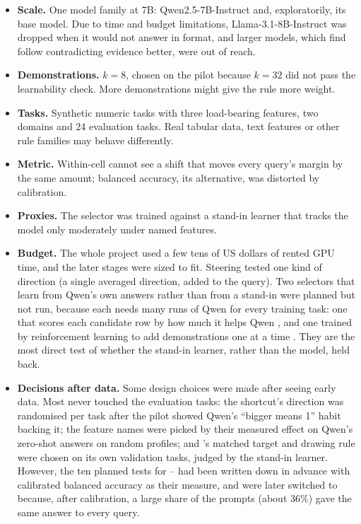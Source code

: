 \begin{itemize}[leftmargin=1.5em]
  \item \textbf{Scale.} One model family at 7B: Qwen2.5-7B-Instruct and, exploratorily, its base model. Due to time and budget limitations, Llama-3.1-8B-Instruct was dropped when it would not answer in format, and larger models, which \citet{wei2023larger} find follow contradicting evidence better, were out of reach.
  \item \textbf{Demonstrations.} $k = 8$, chosen on the pilot because $k = 32$ did not pass the learnability check. More demonstrations might give the rule more weight.
  \item \textbf{Tasks.} Synthetic numeric tasks with three load-bearing features, two domains and 24 evaluation tasks. Real tabular data, text features or other rule families may behave differently.
\item \textbf{Metric.} Within-cell \AUROC cannot see a shift that moves every query's margin by the same amount; balanced accuracy, its alternative, was distorted by calibration.
  \item \textbf{Proxies.} The selector was trained against a stand-in learner that tracks the model only moderately under named features.
\item \textbf{Budget.} The whole project used a few tens of US dollars of rented GPU time, and the later stages were sized to fit. Steering tested one kind of direction (a single averaged direction, added to the query). Two selectors that learn from Qwen's own answers rather than from a stand-in were planned but not run, because each needs many runs of Qwen for every training task: one that scores each candidate row by how much it helps Qwen \citep{chang2023data}, and one trained by reinforcement learning to add demonstrations one at a time \citep{zhang2022active}. They are the most direct test of whether the stand-in learner, rather than the model, held \sata back.

\item \textbf{Decisions after data.} Some design choices were made after seeing early data. Most never touched the evaluation tasks: the shortcut's direction was randomised per task after the pilot showed Qwen's ``bigger means 1'' habit backing it; the feature names were picked by their measured effect on Qwen's zero-shot answers on random profiles; and \sata's matched target and drawing rule were chosen on its own validation tasks, judged by the stand-in learner. However, the ten planned tests for -- had been written down in advance with calibrated balanced accuracy as their measure, and were later switched to \AUROC because, after calibration, a large share of the prompts (about 36\%) gave the same answer to every query.
\end{itemize}

